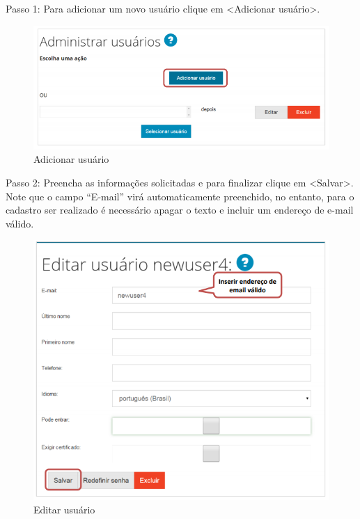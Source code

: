 \documentclass[12pt,hidelinks]{article}
\begin{document}
    Passo 1: Para adicionar um novo usuário clique em <Adicionar usuário>.
    
    \begin{figure}[!htp]
                \centering
                \includegraphics[scale=0.8]{figura/Figura53.png}
                \caption{Adicionar usuário}
            \label{Rotulo}
        \end{figure}
        
    Passo 2: Preencha as informações solicitadas e para finalizar clique em <Salvar>. Note que o campo “E-mail” virá automaticamente preenchido, no entanto, para o cadastro ser realizado é necessário apagar o texto e incluir um endereço de e-mail válido.

\newpage

    \begin{figure}[!htp]
                \centering
                \includegraphics[scale=0.8]{figura/Figura54.png}
                \caption{Editar usuário}
            \label{Rotulo}
        \end{figure}
    
\end{document}
